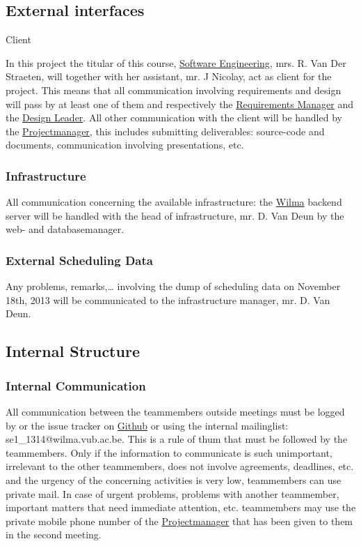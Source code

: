 \documentclass[9pt]{article}
\begin{document}
\subsection{External interfaces}\label{external-interfaces}

Client

In this project the titular of this course, \hyperref[SoftEng]{Software
Engineering}, mrs. R. Van Der Straeten, will together with her
assistant, mr. J Nicolay, act as client for the project. This means that
all communication involving requirements and design will pass by at
least one of them and respectively the
\hyperref[RequirementsManager]{Requirements Manager} and the
\hyperref[Designleader]{Design Leader}. All other communication with the
client will be handled by the \hyperref[Projectmanager]{Projectmanager},
this includes submitting deliverables: source-code and documents,
communication involving presentations, etc.

\subsubsection{Infrastructure}\label{infrastructure}

All communication concerning the available infrastructure: the
\hyperref[Wilma]{Wilma} backend server will be handled with the head of
infrastructure, mr. D. Van Deun by the web- and databasemanager.

\subsubsection{External Scheduling Data}\label{external-scheduling-data}

Any problems, remarks,\ldots{} involving the dump of scheduling data on
November 18th, 2013 will be communicated to the infrastructure manager,
mr. D. Van Deun.

\subsection{Internal Structure}\label{internal-structure}

\subsubsection{Internal Communication}\label{internal-communication}

All communication between the teammembers outside meetings must be
logged by or the issue tracker on \hyperref[Github]{Github} or using the
internal mailinglist: se1\_1314@wilma.vub.ac.be. This is a rule of thum
that must be followed by the teammembers. Only if the information to
communicate is such unimportant, irrelevant to the other teammembers,
does not involve agreements, deadlines, etc. and the urgency of the
concerning activities is very low, teammembers can use private mail. In
case of urgent problems, problems with another teammember, important
matters that need immediate attention, etc. teammembers may use the
private mobile phone number of the
\hyperref[Projectmanager]{Projectmanager} that has been given to them in
the second meeting.
\end{document}
